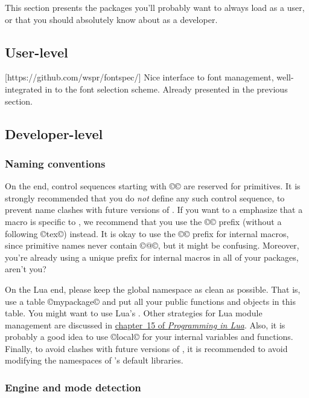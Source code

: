 \documentclass{lltxdoc}
\begin{document}
This section presents the packages you'll probably want to always load as a
user, or that you should absolutely know about as a developer.

\subsection{User-level}

[https://github.com/wspr/fontspec/]
Nice interface to font management, well-integrated in to the \latex font
selection scheme. Already presented in the previous section.

\subsection{Developer-level}

\subsubsection{Naming conventions}

On the \tex end, control sequences starting with ©\luatex© are reserved for
primitives. It is strongly recommended that you do \emph{not} define any such
control sequence, to prevent name clashes with future versions of \luatex. If
you want to a emphasize that a macro is specific to \luatex, we recommend that
you use the ©\lua© prefix (without a following ©tex©) instead. It is okay to
use the ©\luatex@© prefix for internal macros, since primitive names never
contain ©@©, but it might be confusing. Moreover, you're already using a
unique prefix for internal macros in all of your packages, aren't you?

On the Lua end, please keep the global namespace as clean as possible. That
is, use a table ©mypackage© and put all your public functions and objects in
this table. You might want to use Lua's
\href{http://www.lua.org/manual/5.1/manual.html#pdf-module} {}.
Other strategies for Lua module management are discussed in
\href{http://www.lua.org/pil/15.html} {chapter~15 of \emph{Programming in
    Lua}}.  Also, it is probably a good idea to use ©local© for your internal
variables and functions. Finally, to avoid clashes with future versions of
\luatex, it is recommended to avoid modifying the namespaces of \luatex's
default libraries.

\subsubsection{Engine and mode detection}\label{detect}
\end{document}
